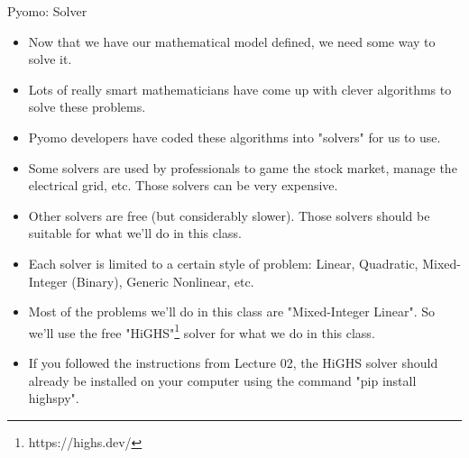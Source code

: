 \documentclass[10pt, aspectratio=169]{beamer}
\begin{document}
\begin{frame}{Pyomo: Solver}
    \begin{itemize}
        \item Now that we have our mathematical model defined, we need some way to solve it.
        \item Lots of really smart mathematicians have come up with clever algorithms to solve these problems.
        \item Pyomo developers have coded these algorithms into "solvers" for us to use.
        \item Some solvers are used by professionals to game the stock market, manage the electrical grid, etc. Those solvers can be very expensive.
        \item Other solvers are free (but considerably slower). Those solvers should be suitable for what we'll do in this class.
        \item Each solver is limited to a certain style of problem: Linear, Quadratic, Mixed-Integer (Binary), Generic Nonlinear, etc.
        \item Most of the problems we'll do in this class are "Mixed-Integer Linear". So we'll use the free "HiGHS"\footnote{https://highs.dev/} solver for what we do in this class.
        \item If you followed the instructions from Lecture 02, the HiGHS solver should already be installed on your computer using the command "pip install highspy".
    \end{itemize}
\end{frame}
\end{document}
